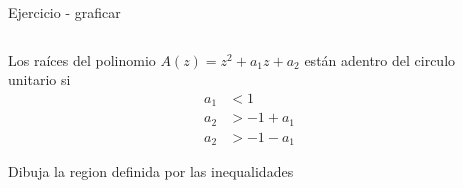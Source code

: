 \documentclass[presentation,aspectratio=169]{beamer}
\begin{document}
\begin{frame}[label={sec:org09056ca}]{Ejercicio - graficar}
\begin{columns}
\begin{column}{0.5\columnwidth}
Los raíces del polinomio \(A(z) = z^2 + a_1z + a_2\) están adentro del circulo unitario si
\begin{align*}
a_1 &< 1\\
a_2 &> -1+a_1\\
a_2 &> -1 - a_1
\end{align*}

\alert{Dibuja la region definida por las inequalidades}
\end{column}
\begin{column}{0.5\columnwidth}
\begin{center}
\end{center}
\end{column}
\end{columns}
\end{frame}
\end{document}
